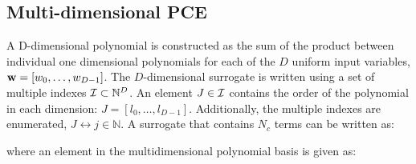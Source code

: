 \documentclass[preprint,12pt]{elsarticle}
\begin{document}

\subsection{Multi-dimensional PCE}

A D-dimensional polynomial is constructed as the sum of the product between individual one dimensional polynomials for each of the $D$ uniform input variables, $\mathbf{w}=[w_0,\dots,w_{D-1}]$. The $D$-dimensional surrogate is written using a set of multiple indexes $\mathcal{I} \subset \mathbb{N}^D$. An element $J\in \mathcal{I}$ contains the order of the polynomial in each dimension: $J = [l_0, \dots, l_{D-1}]$. Additionally, the multiple indexes are enumerated, $J \leftrightarrow j \in \mathbb{N}$. A surrogate that contains $N_c$ terms can be written as:


\noindent where an element in the multidimensional polynomial basis is given as:



\end{document}
